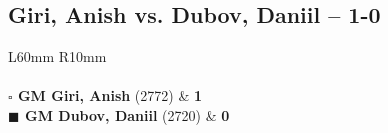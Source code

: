 \documentclass[../main.tex]{subfiles}
\begin{document}
\subsection{Giri,  Anish vs. Dubov,  Daniil -- 1-0}

\begin{multicols*}{2}

\begin{tabular}{L{60mm} R{10mm}}
\\ 
\\[3mm]
\textbf{$\square$ \hspace{2mm}  GM Giri,  Anish} (2772)  & \textbf{1}\\ 
\textbf{$\blacksquare$ \hspace{2mm}  GM Dubov,  Daniil} (2720)  & \textbf{0}\\ 
\end{tabular}

\end{multicols*}
\pagebreak
\end{document}
